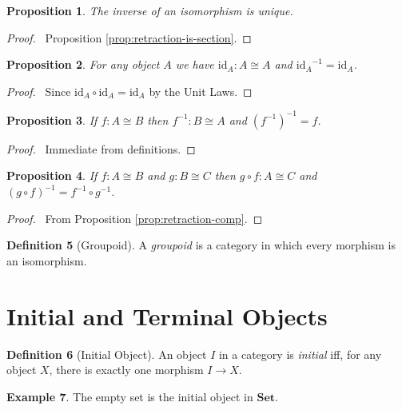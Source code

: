 \documentclass{book}
\let\qed\relax
\newtheorem{prop}{Proposition}[chapter]
\theoremstyle{definition}
\newtheorem{df}[prop]{Definition}
\newtheorem{ex}[prop]{Example}
\newcommand{\id}[1]{\ensuremath{\mathrm{id}_{#1}}}
\newcommand{\inv}[1]{\ensuremath{{#1}^{-1}}}
\newcommand{\Set}{\ensuremath{\mathbf{Set}}}
\begin{document}
\begin{prop}
    \label{prop:inv-unique}
The inverse of an isomorphism is unique.
\end{prop}

\begin{proof}
    \pf\ Proposition \ref{prop:retraction-is-section}. \qed
\end{proof}

\begin{prop}
    For any object $A$ we have $\id{A} : A \cong A$ and $\id{A}^{-1} = \id{A}$.
\end{prop}

\begin{proof}
    \pf\ Since $\id{A} \circ \id{A} = \id{A}$ by the Unit Laws. \qed
\end{proof}

\begin{prop}
    If $f : A \cong B$ then $f^{-1} : B \cong A$ and $(f^{-1})^{-1} = f$.
\end{prop}

\begin{proof}
    \pf\ Immediate from definitions. \qed
\end{proof}

\begin{prop}
    If $f : A \cong B$ and $g : B \cong C$ then $g \circ f : A \cong C$ and $\inv{(g \circ f)} = \inv{f} \circ \inv{g}$.
\end{prop}

\begin{proof}
    \pf\ From Proposition \ref{prop:retraction-comp}. \qed
\end{proof}

\begin{df}[Groupoid]
    A \emph{groupoid} is a category in which every morphism is an isomorphism.
\end{df}

\section{Initial and Terminal Objects}

\begin{df}[Initial Object]
    An object $I$ in a category is \emph{initial} iff, for any object $X$, there is exactly one morphism $I \rightarrow X$.
\end{df}

\begin{ex}
    The empty set is the initial object in $\Set$.
\end{ex}
\end{document}
